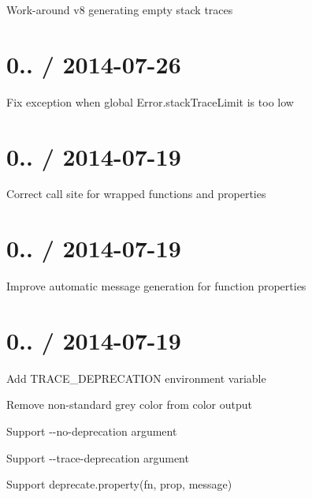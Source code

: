 \begin{DoxyItemize}
\item Work-\/around v8 generating empty stack traces
\end{DoxyItemize}

\section*{0.. / 2014-\/07-\/26 }


\begin{DoxyItemize}
\item Fix exception when global {\ttfamily Error.\+stack\+Trace\+Limit} is too low
\end{DoxyItemize}

\section*{0.. / 2014-\/07-\/19 }


\begin{DoxyItemize}
\item Correct call site for wrapped functions and properties
\end{DoxyItemize}

\section*{0.. / 2014-\/07-\/19 }


\begin{DoxyItemize}
\item Improve automatic message generation for function properties
\end{DoxyItemize}

\section*{0.. / 2014-\/07-\/19 }


\begin{DoxyItemize}
\item Add {\ttfamily T\+R\+A\+C\+E\+\_\+\+D\+E\+P\+R\+E\+C\+A\+T\+I\+ON} environment variable
\item Remove non-\/standard grey color from color output
\item Support {\ttfamily -\/-\/no-\/deprecation} argument
\item Support {\ttfamily -\/-\/trace-\/deprecation} argument
\item Support {\ttfamily deprecate.\+property(fn, prop, message)}
\end{DoxyItemize}

